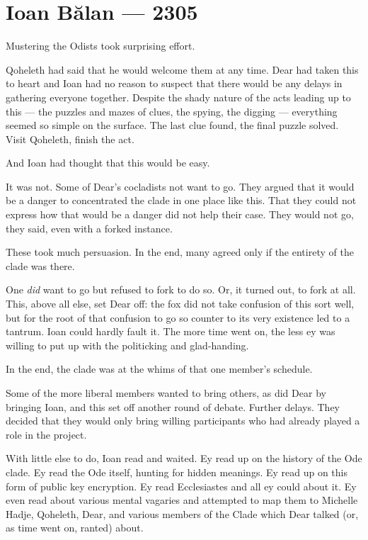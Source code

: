 \hypertarget{ioan-bux103lan-2305}{%
\chapter*{Ioan Bălan — 2305}\label{ioan-bux103lan-2305}}

Mustering the Odists took surprising effort.

Qoheleth had said that he would welcome them at any time. Dear had taken this to heart and Ioan had no reason to suspect that there would be any delays in gathering everyone together. Despite the shady nature of the acts leading up to this — the puzzles and mazes of clues, the spying, the digging — everything seemed so simple on the surface. The last clue found, the final puzzle solved. Visit Qoheleth, finish the act.

And Ioan had thought that this would be easy.

It was not. Some of Dear's cocladists not want to go. They argued that it would be a danger to concentrated the clade in one place like this. That they could not express how that would be a danger did not help their case. They would not go, they said, even with a forked instance.

These took much persuasion. In the end, many agreed only if the entirety of the clade was there.

One \emph{did} want to go but refused to fork to do so. Or, it turned out, to fork at all. This, above all else, set Dear off: the fox did not take confusion of this sort well, but for the root of that confusion to go so counter to its very existence led to a tantrum. Ioan could hardly fault it. The more time went on, the less ey was willing to put up with the politicking and glad-handing.

In the end, the clade was at the whims of that one member's schedule.

Some of the more liberal members wanted to bring others, as did Dear by bringing Ioan, and this set off another round of debate. Further delays. They decided that they would only bring willing participants who had already played a role in the project.

With little else to do, Ioan read and waited. Ey read up on the history of the Ode clade. Ey read the Ode itself, hunting for hidden meanings. Ey read up on this form of public key encryption. Ey read Ecclesiastes and all ey could about it. Ey even read about various mental vagaries and attempted to map them to Michelle Hadje, Qoheleth, Dear, and various members of the Clade which Dear talked (or, as time went on, ranted) about.

